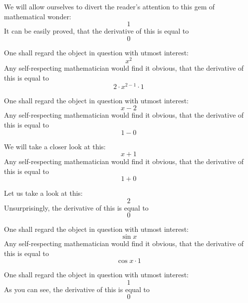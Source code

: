 \documentclass{article}
\begin{document}
We will allow ourselves to divert the reader's attention to this gem of mathematical wonder:
\begin{equation}
1 
\end{equation}
It can be easily proved, that the derivative of this is equal to
\begin{equation}
0 
\end{equation}

One shall regard the object in question with utmost interest:
\begin{equation}
x ^{2 } 
\end{equation}
Any self-respecting mathematician would find it obvious, that the derivative of this is equal to
\begin{equation}
2 \cdot x ^{2 - 1 } \cdot 1 
\end{equation}

One shall regard the object in question with utmost interest:
\begin{equation}
x - 2 
\end{equation}
Any self-respecting mathematician would find it obvious, that the derivative of this is equal to
\begin{equation}
1 - 0 
\end{equation}

We will take a closer look at this:
\begin{equation}
x + 1 
\end{equation}
Any self-respecting mathematician would find it obvious, that the derivative of this is equal to
\begin{equation}
1 + 0 
\end{equation}

Let us take a look at this:
\begin{equation}
2 
\end{equation}
Unsurprisingly, the derivative of this is equal to
\begin{equation}
0 
\end{equation}

One shall regard the object in question with utmost interest:
\begin{equation}
\sin x 
\end{equation}
Any self-respecting mathematician would find it obvious, that the derivative of this is equal to
\begin{equation}
\cos x \cdot 1 
\end{equation}

One shall regard the object in question with utmost interest:
\begin{equation}
1 
\end{equation}
As you can see, the derivative of this is equal to
\begin{equation}
0 
\end{equation}
\end{document}
